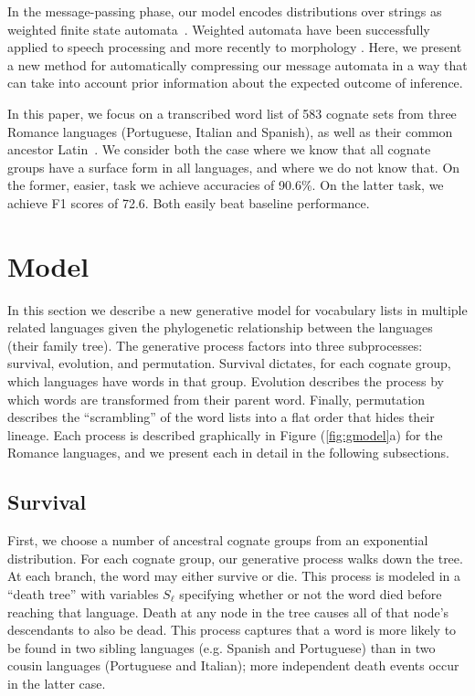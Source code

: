\documentclass[11pt,a4paper]{article}
\begin{document}
In the message-passing phase, our model encodes distributions over
strings as weighted finite state automata~\cite{mohri09weighted}.
Weighted automata have been successfully applied to speech processing
\cite{Mohri96weightedautomata} and more recently to morphology
\cite{dreyer2009graphical}.  Here, we present a new method for
automatically compressing our message automata in a way that can
take into account prior information about the expected outcome of
inference.


In this paper, we focus on a transcribed word list of 583 cognate
sets from three Romance languages (Portuguese, Italian and Spanish),
as well as their common ancestor Latin~\cite{bouchard07probabilistic}.
We consider both the case where we know that all cognate groups
have a surface form in all languages, and where we do not know that.
On the former, easier, task we achieve accuracies of 90.6\%. On the
latter task, we achieve F1 scores of 72.6. Both easily beat baseline
performance.

\section{Model}

In this section we describe a new generative model for vocabulary lists
in multiple related languages given the phylogenetic relationship
between the languages (their family tree). The generative
process factors into three subprocesses: survival, evolution, and
permutation. Survival dictates, for each cognate group, which
languages have words in that group. Evolution describes the process
by which words are transformed from their parent word. Finally,
permutation describes the ``scrambling'' of the word lists into a flat
order that hides their lineage. Each process is described graphically
in Figure (\ref{fig:gmodel}a) for the Romance languages, and we
present each in detail in the following subsections.

\subsection{Survival}

First, we choose a number of ancestral cognate groups from an
exponential distribution.  For each cognate group, our generative
process walks down the tree.  At each branch, the word may either
survive or die.  This process is modeled in a ``death tree'' with
variables $S_\ell$ specifying whether or not the word died before
reaching that language. Death at any node in the tree causes all
of that node's descendants to also be dead.  This process captures
that a word is more likely to be found in two sibling languages
(e.g. Spanish and Portuguese) than in two cousin languages
(Portuguese and Italian); more independent death events occur in the latter case. 
\end{document}
